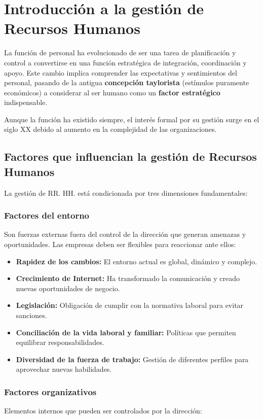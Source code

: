 \chapter{Introducción a la gestión de Recursos Humanos}

La función de personal ha evolucionado de ser una tarea de planificación y control a convertirse en una función estratégica de integración, coordinación y apoyo. Este cambio implica comprender las expectativas y sentimientos del personal, pasando de la antigua \textbf{concepción taylorista} (estímulos puramente económicos) a considerar al ser humano como un \textbf{factor estratégico} indispensable.

Aunque la función ha existido siempre, el interés formal por su gestión surge en el siglo XX debido al aumento en la complejidad de las organizaciones.

\section{Factores que influencian la gestión de Recursos Humanos}

La gestión de RR. HH. está condicionada por tres dimensiones fundamentales:

\subsection{Factores del entorno}
Son fuerzas externas fuera del control de la dirección que generan amenazas y oportunidades. Las empresas deben ser flexibles para reaccionar ante ellos:

\begin{itemize}
    \item \textbf{Rapidez de los cambios:} El entorno actual es global, dinámico y complejo.
    \item \textbf{Crecimiento de Internet:} Ha transformado la comunicación y creado nuevas oportunidades de negocio.
    \item \textbf{Legislación:} Obligación de cumplir con la normativa laboral para evitar sanciones.
    \item \textbf{Conciliación de la vida laboral y familiar:} Políticas que permiten equilibrar responsabilidades.
    \item \textbf{Diversidad de la fuerza de trabajo:} Gestión de diferentes perfiles para aprovechar nuevas habilidades.
\end{itemize}

\subsection{Factores organizativos}
Elementos internos que pueden ser controlados por la dirección:

